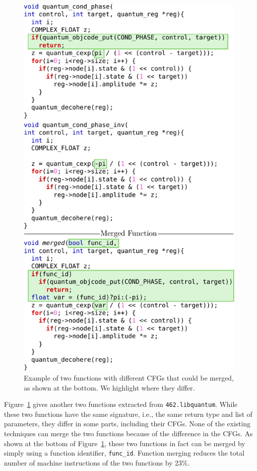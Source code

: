 \begin{figure}[t!]
  \centering
  \includegraphics[width=\linewidth]{figs/libquantum-example.pdf}
  \caption{Example of two functions with different CFGs that could be merged, as shown at the bottom.
           We highlight where they differ.}
  \label{fig:libquantum-example}
\end{figure}


Figure~\ref{fig:libquantum-example} gives another two functions extracted from \texttt{462.libquantum}. While these two functions have the
same signature, i.e., the same return type and list of parameters, they differ in some parts, including their CFGs. None of the existing
techniques can merge the two functions because of the difference in the CFGs. As shown at the bottom of
Figure~\ref{fig:libquantum-example}, these two functions in fact can be merged by simply using a function identifier, \texttt{func\_id}.
Function merging reduces the total number of machine instructions of the two functions by 23\%.

